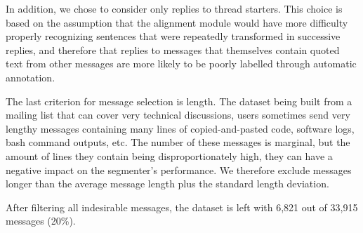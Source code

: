 In addition, we chose to consider only replies to thread starters. This choice is based on the assumption that the alignment module would have more difficulty properly recognizing sentences that were repeatedly transformed in successive replies, and therefore that replies to messages that themselves contain quoted text from other messages are more likely to be poorly labelled through automatic annotation.

The last criterion for message selection is length. The dataset being built from a mailing list that can cover very technical discussions, users sometimes send very lengthy messages containing many lines of copied-and-pasted code, software logs, bash command outputs, etc. The number of these messages is marginal, but the amount of lines they contain being disproportionately high, they can have a negative impact on the segmenter's performance. We therefore exclude messages longer than the average message length plus the standard length deviation.

After filtering all indesirable messages, the dataset is left with 6,821 out of 33,915 messages (20\%).